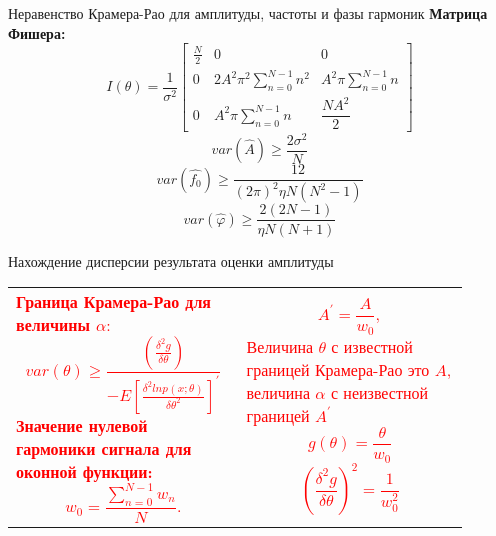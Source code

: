 \begin{frame}{Неравенство Крамера-Рао для амплитуды, частоты и фазы гармоник}
\textbf{Матрица Фишера:}
\begin{equation}
\label{eq:equation15}
I(\theta) = \frac{1}{\sigma^2}
\begin{bmatrix}
	\frac{N}{2} & 0 & 0 \\
	0 & 2A^2 \pi^2 \displaystyle\sum_{n=0}^{N-1} n^2 & A^2 \pi \displaystyle\sum_{n=0}^{N-1} n \\
	0 & A^2 \pi \displaystyle\sum_{n=0}^{N-1} n & \dfrac{NA^2}{2}
\end{bmatrix}
\end{equation}
\begin{equation}
\label{eq:equation16}
var(\hat{A})\geq \frac{2  \sigma^2}{N} 
\end{equation}
\begin{equation}
\label{eq:equation17}
var(\hat{f_0})\geq \frac{12}{(2\pi)^2 \eta  N(N^2 - 1)}  
\end{equation}
\begin{equation}
\label{eq:equation18}
var(\hat{\varphi})\geq \frac{2(2N-1)}{\eta N(N+1)}  
\end{equation}
\end{frame}

\begin{frame}{Нахождение дисперсии результата оценки амплитуды}
\begin{tabular}{m{0.45\linewidth}m{0.45\linewidth}}
\textcolor{red}{\textbf{Граница Крамера-Рао для величины $\alpha$}:
\begin{equation}
\label{eq:equation19}
var(\theta)\geq \frac{\left(\frac{\delta^2 g}{\delta\theta}\right)}{-E\left[\frac{\delta^2 ln p(x;\theta)}{\delta \theta^2}\right]^{'}}
\end{equation}
\textbf{Значение нулевой гармоники сигнала для оконной функции:}
\begin{equation}
\label{eq:equation20}
w_0= \frac{\sum_{n=0}^{N-1} w_n}{N}.	  
\end{equation}}
&
\textcolor{red}{\begin{equation}
\label{eq:equation21}
A^{'}=\frac{A}{w_0} ,		  
\end{equation}
Величина $\theta$ с известной границей Крамера-Рао это $A$, 
величина $\alpha$  с неизвестной границей $A^{'}$
\begin{equation}
\label{eq:equation22}
g(\theta)=\frac{\theta}{w_0}
\end{equation}
\begin{equation}
\label{eq:equation23}
\left(\frac{\delta^2 g}{\delta \theta}\right)^2=\frac{1}{w_0^2}
\end{equation}}
\end{tabular}
\end{frame}


